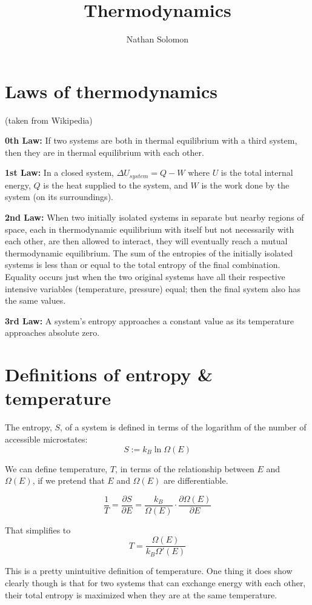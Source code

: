 \documentclass[12pt]{article}
\begin{document}
\title{Thermodynamics}
\author{Nathan Solomon}
\maketitle

\section{Laws of thermodynamics}
(taken from Wikipedia)

\textbf{0th Law:} If two systems are both in thermal equilibrium with a third system, then they are in thermal equilibrium with each other.

\textbf{1st Law:} In a closed system, $\Delta U_{system} = Q - W$ where $U$ is the total internal energy, $Q$ is the heat supplied to the system, and $W$ is the work done by the system (on its surroundings).

\textbf{2nd Law:} When two initially isolated systems in separate but nearby regions of space, each in thermodynamic equilibrium with itself but not necessarily with each other, are then allowed to interact, they will eventually reach a mutual thermodynamic equilibrium. The sum of the entropies of the initially isolated systems is less than or equal to the total entropy of the final combination. Equality occurs just when the two original systems have all their respective intensive variables (temperature, pressure) equal; then the final system also has the same values.

\textbf{3rd Law:} A system's entropy approaches a constant value as its temperature approaches absolute zero.

\section{Definitions of entropy \& temperature}
The entropy, $S$, of a system is defined in terms of the logarithm of the number of accessible microstates:
\[S := k_B \ln{\Omega(E)}\]

We can define temperature, $T$, in terms of the relationship between $E$ and $\Omega(E)$, if we pretend that $E$ and $\Omega(E)$ are differentiable.

\[\frac{1}{T} = \frac{\partial S}{\partial E} = \frac{k_B}{\Omega(E)} \cdot \frac{\partial \Omega(E)}{\partial E}\]

That simplifies to
\[T = \frac{\Omega(E)}{k_B \Omega'(E)}\]

This is a pretty unintuitive definition of temperature. One thing it does show clearly though is that for two systems that can exchange energy with each other, their total entropy is maximized when they are at the same temperature.
\end{document}
